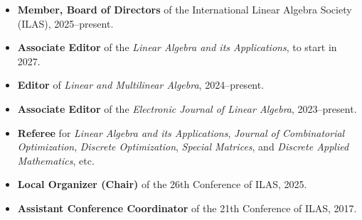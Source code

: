 \documentclass[11pt]{article}
\newenvironment{nobulletlist}{\begin{itemize}[leftmargin=1em,label=]}{\end{itemize}}
\def \heading#1{\vspace{3pt}\large{\sffamily{\textbf{#1}}}\vspace{-8pt}}
\begin{document}
\begin{longcv}\newpage\end{longcv}
\heading{PROFESSIONAL SERVICES}
\begin{nobulletlist}
\item \textbf{Member, Board of Directors} of the International Linear Algebra Society (ILAS), 2025--present.
\item \textbf{Associate Editor} of the \emph{Linear Algebra and its Applications}, to start in 2027.
\item \textbf{Editor} of \emph{Linear and Multilinear Algebra}, 2024--present.
\item \textbf{Associate Editor} of the \emph{Electronic Journal of Linear Algebra}, 2023--present.
\item \textbf{Referee} for \emph{Linear Algebra and its Applications}, \emph{Journal of Combinatorial Optimization}, \emph{Discrete Optimization}, \emph{Special Matrices}, and \emph{Discrete Applied Mathematics}, etc.
\item \textbf{Local Organizer (Chair)} of the 26th Conference of ILAS, 2025.  
\item \textbf{Assistant Conference Coordinator} of the 21th Conference of ILAS, 2017. 
\end{nobulletlist}

\end{document}
